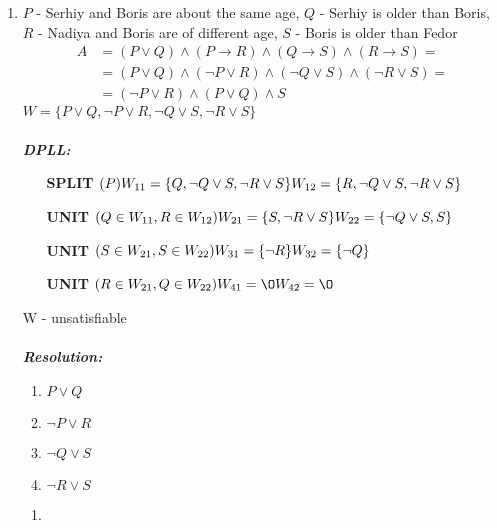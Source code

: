 \documentclass[a4paper,12pt]{article}
\begin{document}
\begin{enumerate}
	\item 
	$P$ - Serhiy and Boris are about the same age, $Q$ - Serhiy is older than Boris, $R$ - Nadiya and Boris are of different age, $S$ - Boris is older than Fedor
	\begin{align*}
		A&=(P\lor Q)\land(P\to R)\land(Q\to S)\land (R\to S)=\\&=(P\lor Q)\land(\neg P\lor R)\land(\neg Q\lor S)\land (\neg R\lor S)=\\&=(\neg P\lor R)\land(P\lor Q)\land S
	\end{align*}
	$W=\{P\lor Q,\neg P\lor R,\neg Q\lor S,\neg R\lor S\}$
	\\\\\emph{\textbf{DPLL:}}\\
	\begin{itemize}
		\item [\textbf{SPLIT}] $(P)\\W_{11}=\{Q,\neg Q\lor S,\neg R\lor S\}\\W_{12}=\{R,\neg Q\lor S,\neg R\lor S\}$
		\item [\textbf{UNIT}] $(Q\in W_{11},R\in W_{12})\\W_{21}=\{S,\neg R\lor S\}\\W_{22}=\{\neg Q\lor S,S\}$
		\item [\textbf{UNIT}] $(S\in W_{21},S\in W_{22})\\W_{31}=\{\neg R\}\\W_{32}=\{\neg Q\}$
		\item [\textbf{UNIT}] $(R\in W_{21},Q\in W_{22})\\W_{41}=\O\\W_{42}=\O$
	\end{itemize}
	W - unsatisfiable
	\\\\\emph{\textbf{Resolution:}}\\
	\begin{multicols}{4}
		\begin{enumerate}[(1)]
			\item $P\lor Q$
			\item $\neg P\lor R$
			\item $\neg Q\lor S$
			\item $\neg R\lor S$
		\end{enumerate}
	\end{multicols}
	\begin{multicols}{2}
		\begin{enumerate}
			\item \begin{align*}

\end{align*}
\end{enumerate}
\end{multicols}
\end{enumerate}
\end{document}
